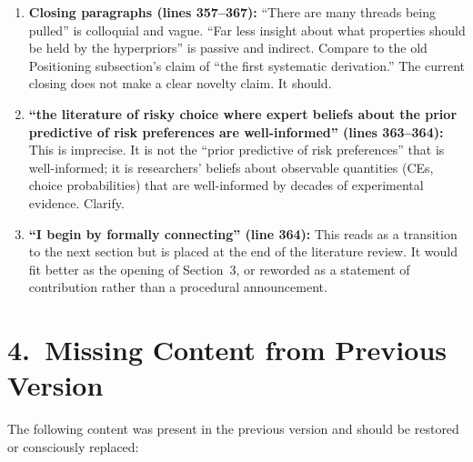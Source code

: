 \documentclass[12pt,a4paper]{article}
\begin{document}
\begin{enumerate}[leftmargin=1.5em]
  \item \textbf{Closing paragraphs (lines 357--367):} ``There are many
    threads being pulled'' is colloquial and vague. ``Far less insight about
    what properties should be held by the hyperpriors'' is passive and
    indirect. Compare to the old Positioning subsection's claim of ``the first
    systematic derivation.'' The current closing does not make a clear novelty
    claim. It should.

  \item \textbf{``the literature of risky choice where expert beliefs about
    the prior predictive of risk preferences are well-informed'' (lines
    363--364):} This is imprecise. It is not the ``prior predictive of risk
    preferences'' that is well-informed; it is researchers' beliefs about
    observable quantities (CEs, choice probabilities) that are well-informed
    by decades of experimental evidence. Clarify.

  \item \textbf{``I begin by formally connecting'' (line 364):} This reads as
    a transition to the next section but is placed at the end of the
    literature review. It would fit better as the opening of Section~3, or
    reworded as a statement of contribution rather than a procedural
    announcement.
\end{enumerate}


\section{4.\ Missing Content from Previous Version}

The following content was present in the previous version and should be
restored or consciously replaced:
\end{document}
